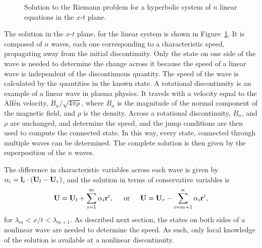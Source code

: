 \begin{figure}[htbp]
\begin{center}

\end{center}
\caption{Solution to the Riemann problem for a hyperbolic system of $n$ linear equations in the $x$-$t$ plane.}
\label{fig:lin_sys_rstates}
\end{figure}

The solution in the $x$-$t$ plane, for the linear system is shown in Figure~\ref{fig:lin_sys_rstates}.  It is composed of $n$ waves, each one corresponding to a characteristic speed, propagating away from the initial discontinuity.  Only the state on one side of the wave is needed to determine the change across it because the speed of a linear wave is independent of the discontinuous quantity.  The speed of the wave is calculated by the quantities in the known state.  A rotational discontinuity is an example of a linear wave in plasma physics.  It travels with a velocity equal to the Alf{\'e}n velocity, $B_n/\sqrt{4\pi\rho}$, where $B_n$ is the magnitude of the normal component of the magnetic field, and $\rho$ is the density.  Across a rotational discontinuity, $B_n$, and $\rho$ are unchanged, and determine the speed, and the jump conditions are then used to compute the connected state.  In this way, every state, connected through multiple waves can be determined.  The complete solution is then given by the superposition of the $n$ waves.  

The difference in characteristic variables across each wave is given by $\alpha_i = \mathbf{l}_i \cdot (\mathbf{U}_l - \mathbf{U}_r)$, and the solution in terms of conservative variables is 
\begin{gather*} 
\mathbf{U} = \mathbf{U}_l + \sum_{i=1}^m \alpha_i \mathbf{r}^i, \;\;\;\;\text{ or }\;\;\;\; \mathbf{U} = \mathbf{U}_r - \sum_{i=m+1}^n \alpha_i \mathbf{r}^i,
\end{gather*} 
for $\lambda_m < x/t < \lambda_{m+1}$.  As described next section, the states on both sides of a nonlinear wave are needed to determine the speed.  As such, only local knowledge of the solution is available at a nonlinear discontinuity.

